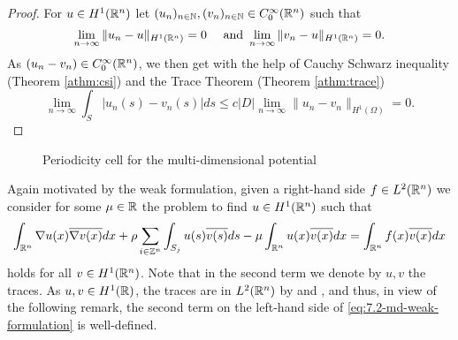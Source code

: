 \begin{proof}
	For $u \in H^{1}(\mathbb{R}^{n})$ let $(u_{n})_{n \in \mathbb{N}}, (v_{n})_{n \in \mathbb{N}} \in C_{0}^{\infty}(\mathbb{R}^{n})$ such that
	\[ \lim_{n \rightarrow \infty} \| u_{n} - u \|_{H^{1}(\mathbb{R}^{n})} = 0 \quad \text{ and } \lim_{n \rightarrow \infty} \| v_{n} - u\|_{H^{1}(\mathbb{R}^{n})} = 0.  \]
	As $(u_{n} - v_{n}) \in C_{0}^{\infty}(\mathbb{R}^{n})$, we then get with the help of Cauchy Schwarz inequality (Theorem \ref{athm:csi}) and the Trace Theorem (Theorem \ref{athm:trace})
	\[ \lim_{n \rightarrow \infty} \int_{S} \left| u_{n}(s) - v_{n}(s) \right| ds \leq c |D| \lim_{n \rightarrow \infty} \| u_{n} - v_{n} \|_{H^{1}(\Omega)} = 0. \] 
\end{proof}

\begin{figure}[!ht] \centering
	\caption{Periodicity cell for the multi-dimensional potential} \label{fig:7.1}
\end{figure}

Again motivated by the weak formulation, given a right-hand side $f \in L^{2}(\mathbb{R}^{n})$ we consider for some $\mu \in \mathbb{R}$ the problem to find $u \in H^{1}(\mathbb{R}^{n})$ such that
	\begin{equation}
		\int_{\mathbb{R}^{n}} \nabla u(x) \overline{\nabla v(x)} dx + \rho \sum_{i \in \mathbb{Z}^{n}} \int_{S_{j}} u(s) \overline{v(s)} ds - \mu \int_{\mathbb{R}^{n}} u(x) \overline{v(x)} dx = \int_{\mathbb{R}^{n}} f(x) \overline{v(x)} dx \label{eq:7.2-md-weak-formulation}
	\end{equation} 
holds for all $v \in H^{1}(\mathbb{R}^{n})$. Note that in the second term we denote by $u, v$ the traces. As $u, v \in H^{1}(\mathbb{R})$, the traces are in $L^{2}(\mathbb{R}^{n})$ by \cite[p. 251, Theorem 5.1]{evans1998partial} and \cite[p. 164]{adams2003sobolev}, and thus, in view of the following remark, the second term on the left-hand side of \eqref{eq:7.2-md-weak-formulation} is well-defined.

